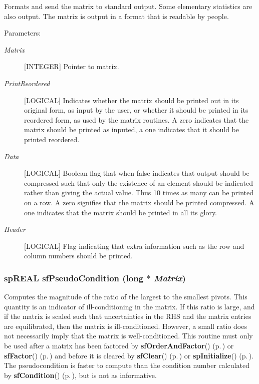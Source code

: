 Formats and send the matrix to standard output. Some elementary statistics are also output. The matrix is output in a format that is readable by people.\begin{Desc}
\item[Parameters: ]\par
\begin{description}
\item[{\em 
Matrix}][INTEGER] Pointer to matrix. \item[{\em 
Print\-Reordered}][LOGICAL] Indicates whether the matrix should be printed out in its original form, as input by the user, or whether it should be printed in its reordered form, as used by the matrix routines. A zero indicates that the matrix should be printed as inputed, a one indicates that it should be printed reordered. \item[{\em 
Data}][LOGICAL] Boolean flag that when false indicates that output should be compressed such that only the existence of an element should be indicated rather than giving the actual value. Thus 10 times as many can be printed on a row. A zero signifies that the matrix should be printed compressed. A one indicates that the matrix should be printed in all its glory. \item[{\em 
Header}][LOGICAL] Flag indicating that extra information such as the row and column numbers should be printed. \end{description}
\end{Desc}
\subsubsection{\setlength{\rightskip}{0pt plus 5cm}sp\-REAL sf\-Pseudo\-Condition (long $\ast$ {\em Matrix})}\label{spFortran_8c_a84}


Computes the magnitude of the ratio of the largest to the smallest pivots. This quantity is an indicator of ill-conditioning in the matrix. If this ratio is large, and if the matrix is scaled such that uncertainties in the RHS and the matrix entries are equilibrated, then the matrix is ill-conditioned. However, a small ratio does not necessarily imply that the matrix is well-conditioned. This routine must only be used after a matrix has been factored by {\bf sf\-Order\-And\-Factor}() {\rm (p.\,\pageref{spFortran_8c_a61})} or {\bf sf\-Factor}() {\rm (p.\,\pageref{spFortran_8c_a62})} and before it is cleared by {\bf sf\-Clear}() {\rm (p.\,\pageref{spFortran_8c_a50})} or {\bf sp\-Initialize}() {\rm (p.\,\pageref{spBuild_8c_a21})}. The pseudocondition is faster to compute than the condition number calculated by {\bf sf\-Condition}() {\rm (p.\,\pageref{spFortran_8c_a85})}, but is not as informative.

